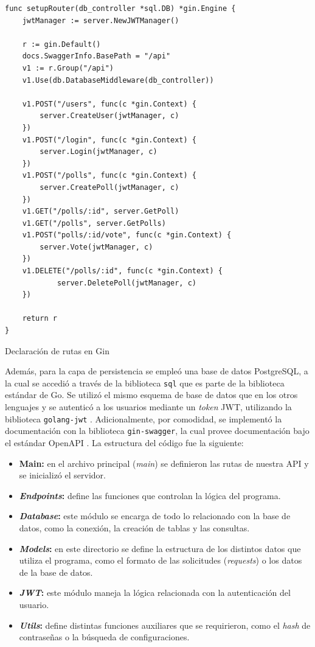 \documentclass[11pt]{article}
\newcommand{\english}[1]{\textit{#1}}
\begin{document}
\begin{listing}
\begin{verbatim}
func setupRouter(db_controller *sql.DB) *gin.Engine {
	jwtManager := server.NewJWTManager()

	r := gin.Default()
	docs.SwaggerInfo.BasePath = "/api"
	v1 := r.Group("/api")
	v1.Use(db.DatabaseMiddleware(db_controller))
	
	v1.POST("/users", func(c *gin.Context) {
		server.CreateUser(jwtManager, c)
	})
	v1.POST("/login", func(c *gin.Context) {
		server.Login(jwtManager, c)
	})
	v1.POST("/polls", func(c *gin.Context) {
		server.CreatePoll(jwtManager, c)
	})
	v1.GET("/polls/:id", server.GetPoll)
	v1.GET("/polls", server.GetPolls)
	v1.POST("polls/:id/vote", func(c *gin.Context) {
		server.Vote(jwtManager, c)
	})
	v1.DELETE("/polls/:id", func(c *gin.Context) {
            server.DeletePoll(jwtManager, c)
	})

	return r
}
\end{verbatim}
\caption{Declaración de rutas en Gin}
\label{code:http_go:gin}
\end{listing}

Además, para la capa de persistencia se empleó una base de datos PostgreSQL, a la cual se accedió a través de la biblioteca \lstinline{sql} \cite{http:go:sql} que es parte de la biblioteca estándar de Go. Se utilizó el mismo esquema de base de datos que en los otros lenguajes y se autenticó a los usuarios mediante un \english{token} JWT, utilizando la biblioteca \lstinline{golang-jwt} \cite{http:go:jwt}. Adicionalmente, por comodidad, se implementó la documentación con la biblioteca \lstinline{gin-swagger}, la cual provee documentación bajo el estándar OpenAPI \cite{http:ex:openapi}. La estructura del código fue la siguiente:

\begin{itemize}
    \item \textbf{Main:} en el archivo principal (\textit{main}) se definieron las rutas de nuestra API y se inicializó el servidor.
    
    \item \textbf{\textit{Endpoints}:} define las funciones que controlan la lógica del programa.
    
    \item \textbf{\textit{Database}:} este módulo se encarga de todo lo relacionado con la base de datos, como la conexión, la creación de tablas y las consultas.
    
    \item \textbf{\textit{Models}:} en este directorio se define la estructura de los distintos datos que utiliza el programa, como el formato de las solicitudes (\english{requests}) o los datos de la base de datos.
    
    \item \textbf{\textit{JWT}:} este módulo maneja la lógica relacionada con la autenticación del usuario.
    
    \item \textbf{\textit{Utils}:} define distintas funciones auxiliares que se requirieron, como el \english{hash} de contraseñas o la búsqueda de configuraciones.
\end{itemize}
\end{document}
